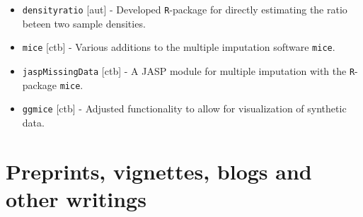 \documentclass[11pt,a4paper,roman,colorlinks,linkcolor = blue]{moderncv}        %
\begin{document}
\begin{itemize}
\item[$\circ$] \texttt{densityratio} [aut] - Developed \texttt{R}-package for directly estimating the ratio beteen two sample densities.
\item[$\circ$] \texttt{mice} [ctb] - Various additions to the multiple imputation software \texttt{mice}.
\item[$\circ$] \texttt{jaspMissingData} [ctb] - A JASP module for multiple imputation with the \texttt{R}-package \texttt{mice}.
\item[$\circ$] \texttt{ggmice} [ctb] - Adjusted functionality to allow for visualization of synthetic data.
\end{itemize}

\section{Preprints, vignettes, blogs and other writings}
\end{document}
